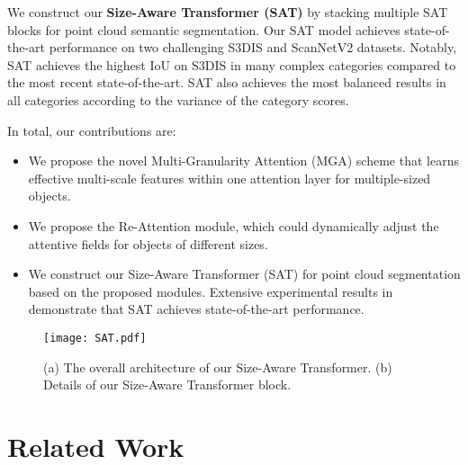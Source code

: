 \documentclass[10pt,twocolumn,letterpaper]{article}
\begin{document}
We construct our \textbf{Size-Aware Transformer (SAT)} by stacking multiple SAT blocks for point cloud semantic segmentation. Our SAT model achieves state-of-the-art performance on two challenging S3DIS\cite{datasets3dis} and ScanNetV2\cite{datasetscannet} datasets. Notably, SAT achieves the highest IoU on S3DIS in many complex categories compared to the most recent state-of-the-art. SAT also achieves the most balanced results in all categories according to the variance of the category scores. 





In total, our contributions are:
\begin{itemize}
   
    
    \item We propose the novel Multi-Granularity Attention (MGA) scheme that learns effective multi-scale features within one attention layer for multiple-sized objects.
    \item We propose the Re-Attention module, which could dynamically adjust the attentive fields for objects of different sizes.
    \item We construct our Size-Aware Transformer (SAT) for point cloud segmentation based on the proposed modules. Extensive experimental results in~ demonstrate that SAT achieves state-of-the-art performance.
\end{itemize}
 


\begin{figure*}
\centering
\texttt{[image: SAT.pdf]}
\caption{(a) The overall architecture of our Size-Aware Transformer. (b) Details of our Size-Aware Transformer block.}
\label{fig-SAT}
\end{figure*}

\section{Related Work}
\end{document}
